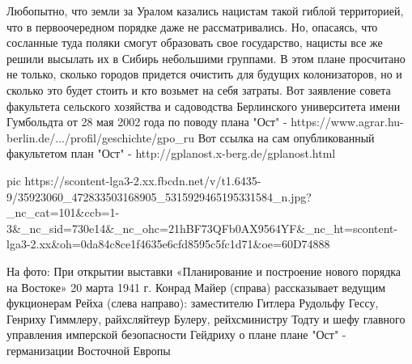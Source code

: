 Любопытно, что земли за Уралом казались нацистам такой гиблой территорией, что в первоочередном порядке даже не рассматривались. Но, опасаясь, что сосланные туда поляки смогут образовать свое государство, нацисты все же решили высылать их в Сибирь небольшими группами.
В этом плане просчитано не только, сколько городов придется очистить для будущих колонизаторов, но и сколько это будет стоить и кто возьмет на себя затраты.
Вот заявление совета факультета сельского хозяйства и садоводства Берлинского университета имени Гумбольдта от 28 мая 2002 года по поводу плана "Ост"  - https://www.agrar.hu-berlin.de/.../profil/geschichte/gpo_ru
Вот ссылка на сам опубликованный факультетом план "Ост" - http://gplanost.x-berg.de/gplanost.html 

\ifcmt
  pic https://scontent-lga3-2.xx.fbcdn.net/v/t1.6435-9/35923060_472833503168905_5315929465195331584_n.jpg?_nc_cat=101&ccb=1-3&_nc_sid=730e14&_nc_ohc=21hBF73QFb0AX9564YF&_nc_ht=scontent-lga3-2.xx&oh=0da84c8ce1f4635e6cfd8595c5fc1d71&oe=60D74888
\fi

На фото: При открытии выставки «Планирование и построение нового порядка на
Востоке» 20 марта 1941 г. Конрад Майер (справа) рассказывает
ведущим фукционерам Рейха (слева направо): заместителю Гитлера Рудольфу
Гессу, Генриху Гиммлеру, райхсляйтеур Булеру, рейхсминистру Тодту и шефу
главного управления имперской безопасности Гейдриху о плане плане "Ост" - германизации Восточной Европы
